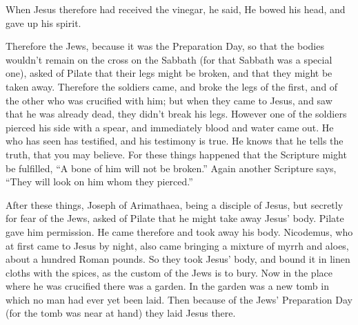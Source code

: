 {When Jesus therefore had received the vinegar, he said,
{} He bowed his head, and gave up his spirit.
\par }{\PP {}Therefore the Jews, because it was the Preparation Day, so that the bodies wouldn’t remain on the cross on the Sabbath (for that Sabbath was a special one), asked of Pilate that their legs might be broken, and that they might be taken away.
Therefore the soldiers came, and broke the legs of the first, and of the other who was crucified with him;
but when they came to Jesus, and saw that he was already dead, they didn’t break his legs.
However one of the soldiers pierced his side with a spear, and immediately blood and water came out.
He who has seen has testified, and his testimony is true. He knows that he tells the truth, that you may believe.
For these things happened that the Scripture might be fulfilled, “A bone of him will not be broken.”
Again another Scripture says, “They will look on him whom they pierced.”
\par }{\PP {}After these things, Joseph of Arimathaea, being a disciple of Jesus, but secretly for fear of the Jews, asked of Pilate that he might take away Jesus’ body. Pilate gave him permission. He came therefore and took away his body.
Nicodemus, who at first came to Jesus by night, also came bringing a mixture of myrrh and aloes, about a hundred Roman pounds.
So they took Jesus’ body, and bound it in linen cloths with the spices, as the custom of the Jews is to bury.
Now in the place where he was crucified there was a garden. In the garden was a new tomb in which no man had ever yet been laid.
Then because of the Jews’ Preparation Day (for the tomb was near at hand) they laid Jesus there.

}
